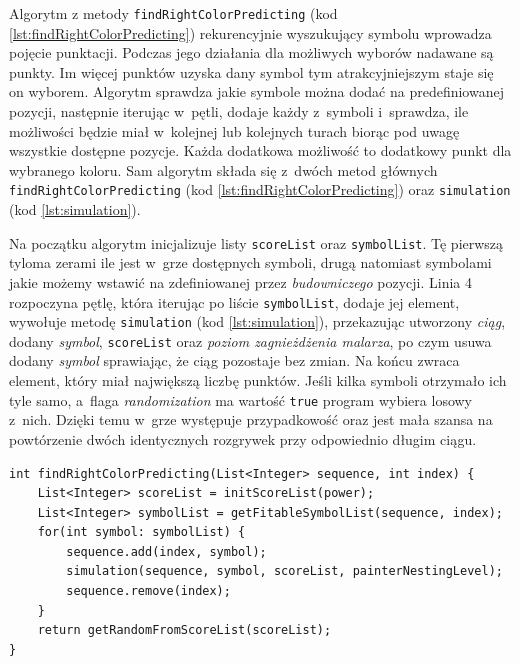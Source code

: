 \documentclass[document]{xmgr}
\begin{document}
Algorytm z metody \texttt{findRightColorPredicting} (kod \ref{lst:findRightColorPredicting}) rekurencyjnie wyszukujący symbolu wprowadza pojęcie punktacji. Podczas jego działania dla możliwych wyborów nadawane są punkty. Im więcej punktów uzyska dany symbol tym atrakcyjniejszym staje się on wyborem. Algorytm sprawdza jakie symbole można dodać na predefiniowanej pozycji, następnie iterując w~pętli, dodaje każdy z~symboli i~sprawdza, ile możliwości będzie miał w~kolejnej lub kolejnych turach biorąc pod uwagę wszystkie dostępne pozycje. Każda dodatkowa możliwość to dodatkowy punkt dla wybranego koloru. Sam algorytm składa się z~dwóch metod głównych \mbox{\texttt{findRightColorPredicting}} (kod \ref{lst:findRightColorPredicting}) oraz \texttt{simulation} (kod \ref{lst:simulation}).

Na początku algorytm inicjalizuje listy \texttt{scoreList} oraz \texttt{symbolList}. Tę pierwszą tyloma zerami ile jest w~grze dostępnych symboli, drugą natomiast symbolami jakie możemy wstawić na zdefiniowanej przez \emph{budowniczego} pozycji. Linia 4 rozpoczyna pętlę, która iterując po liście \texttt{symbolList}, dodaje jej element, wywołuje metodę \texttt{simulation} (kod \ref{lst:simulation}), przekazując utworzony \emph{ciąg}, dodany \emph{symbol}, \texttt{scoreList} oraz \emph{poziom zagnieżdżenia malarza}, po czym usuwa dodany \emph{symbol} sprawiając, że ciąg pozostaje bez zmian. Na końcu zwraca element, który miał największą liczbę punktów. Jeśli kilka symboli otrzymało ich tyle samo, a~flaga \emph{randomization} ma wartość \texttt{true} program wybiera losowy z~nich. Dzięki temu w~grze występuje przypadkowość oraz jest mała szansa na powtórzenie dwóch identycznych rozgrywek przy odpowiednio długim ciągu.

\newpage
\begin{lstlisting}[caption={Metoda szukająca symbolu, wykorzystująca rekurencję.},label=lst:findRightColorPredicting]
int findRightColorPredicting(List<Integer> sequence, int index) {
	List<Integer> scoreList = initScoreList(power);
	List<Integer> symbolList = getFitableSymbolList(sequence, index);
	for(int symbol: symbolList) {
		sequence.add(index, symbol);
		simulation(sequence, symbol, scoreList, painterNestingLevel);
		sequence.remove(index);
	}
	return getRandomFromScoreList(scoreList);
}
\end{lstlisting}
\end{document}
